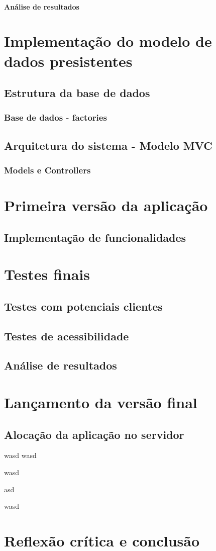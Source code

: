 \documentclass[11pt, twoside]{report}
\begin{document}
	\subsubsection{Análise de resultados}
	
	\chapter{Implementação do modelo de dados presistentes}
	\section{Estrutura da base de dados}
	\subsection{Base de dados - factories}
	\section{Arquitetura do sistema - Modelo MVC}
	\subsection{Models e Controllers}
	
	\chapter{Primeira versão da aplicação}
	\section{Implementação de funcionalidades}
	
	\chapter{Testes finais}
	\section{Testes com potenciais clientes}
	\section{Testes de acessibilidade}
	\section{Análise de resultados}
	
	\chapter{Lançamento da versão final}
	\section{Alocação da aplicação no servidor}
	
	\pagebreak
	wasd
	wasd
	
	
	wasd
	
	
	\pagebreak
	
	asd
	
	wasd
	\chapter{Reflexão crítica e conclusão}
	
	

	
	
	
\end{document}
